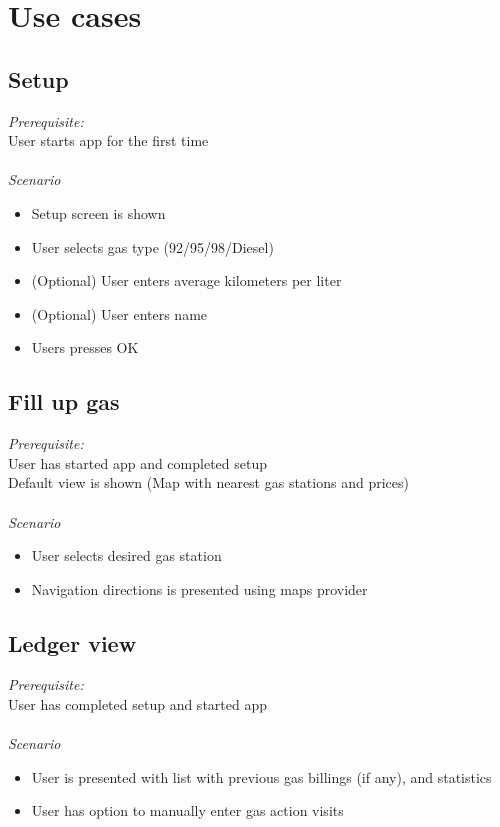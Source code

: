 
\chapter{Use cases}

\section{Setup}
\emph{Prerequisite:}\\
User starts app for the first time\\
\\
\emph{Scenario}
\begin{itemize}
\item Setup screen is shown
\item User selects gas type (92/95/98/Diesel)
\item (Optional) User enters average kilometers per liter
\item (Optional) User enters name
\item Users presses OK
\end{itemize}

\section{Fill up gas}
\emph{Prerequisite:}\\
User has started app and completed setup\\
Default view is shown (Map with nearest gas stations and prices)\\
\\
\emph{Scenario}
\begin{itemize}
\item User selects desired gas station
\item Navigation  directions is presented using maps provider
\end{itemize}

\section{Ledger view}
\emph{Prerequisite:}\\
User has completed setup and started app\\
\\
\emph{Scenario}
\begin{itemize}
	\item User is presented with list with previous gas billings (if any), and statistics
	\item User has option to manually enter gas action visits
\end{itemize}

